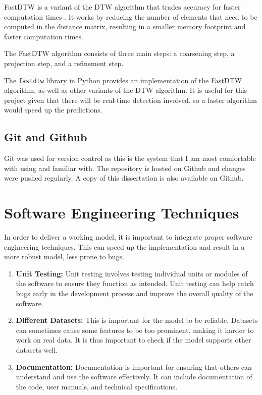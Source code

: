 \documentclass[final,rdr32.tex]{subfiles}
\begin{document}
FastDTW is a variant of the DTW algorithm that trades accuracy for faster computation times \cite{salvador2007toward}. It works by reducing the number of elements that need to be computed in the distance matrix, resulting in a smaller memory footprint and faster computation times.

The FastDTW algorithm consists of three main steps: a coarsening step, a projection step, and a refinement step.

The \verb|fastdtw| library in Python provides an implementation of the FastDTW algorithm, as well as other variants of the DTW algorithm. It is useful for this project given that there will be real-time detection involved, so a faster algorithm would speed up the predictions.

\subsection{Git and Github}

Git was used for version control as this is the system that I am most comfortable with using and familiar with. The repository is hosted on Github and changes were pushed regularly. A copy of this dissertation is also available on Github.

\section{Software Engineering Techniques}

In order to deliver a working model, it is important to integrate proper software engineering techniques. This can speed up the implementation and result in a more robust model, less prone to bugs.

\begin{enumerate}

    \item \textbf{Unit Testing:} Unit testing involves testing individual units or modules of the software to ensure they function as intended. Unit testing can help catch bugs early in the development process and improve the overall quality of the software.
    \item \textbf{Different Datasets:} This is important for the model to be reliable. Datasets can sometimes cause some features to be too prominent, making it harder to work on real data. It is thus important to check if the model supports other datasets well.
    \item \textbf{Documentation:} Documentation is important for ensuring that others can understand and use the software effectively. It can include documentation of the code, user manuals, and technical specifications.
\end{enumerate}
\end{document}
